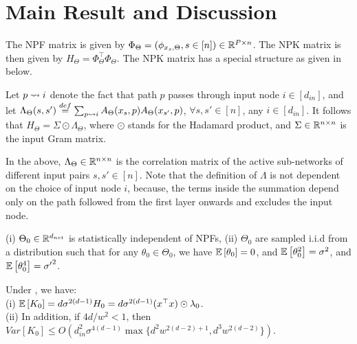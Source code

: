 \section{Main Result and Discussion}
The NPF matrix is given by $\Phi_{\Theta}=(\phi_{x_s,\Theta},s\in[n])\in\mathbb{R}^{P\times n}$. The NPK matrix is then given by $H_{\Theta}=\Phi^\top_{\Theta}\Phi_{\Theta}$. The NPK matrix has a special structure as given in  below.
\begin{lemma}\label{lm:npk}
Let $p\rightsquigarrow i$ denote the fact that path $p$ passes through input node $i\in[d_{in}]$, and let $\Lambda_{\Theta}(s,s')\stackrel{def}{=}\sum_{p\rightsquigarrow i} A_{\Theta}(x_s,p) A_{\Theta}(x_{s'},p)$, $\forall s,s'\in[n]$, any $i\in [d_{in}]$. It follows that $H_{\Theta}= \Sigma\odot\Lambda_{\Theta}$, where $\odot$ stands for the Hadamard product, and $\Sigma \in \mathbb{R}^{n\times n}$ is the input Gram matrix.
\end{lemma}
In the  above, $\Lambda_{\Theta}\in\mathbb{R}^{n\times n}$ is the correlation matrix of the active sub-networks of different input pairs $s,s'\in[n]$. Note that the definition of $\Lambda$ is not dependent on the choice of input node $i$, because, the terms inside the summation depend only on the path followed from the first layer onwards and excludes the input node.
\begin{assumption}\label{assmp:main}
(i) $\Theta_0\in\mathbb{R}^{d_{net}}$ is statistically independent of NPFs, (ii) $\Theta_0$ are sampled i.i.d from a distribution such that for any $\theta_0\in\Theta_0$,  we have $\mathbb{E}\left[\theta_0\right]=0$, and  $\mathbb{E}\left[\theta^2_0\right]=\sigma^2$, and $\mathbb{E}\left[\theta^4_0\right]={\sigma'}^2$.
\end{assumption}
\begin{theorem}\label{th:main} Under , we have:\\
(i) $\mathbb{E}\left[K_0\right]=d\sigma^{2(d-1)} H_0=d\sigma^{2(d-1)} (x^\top x)\odot \lambda_0$.\\
(ii) In addition, if ${4d}/{w^2}<1$, then $Var\left[K_0\right]\leq O\left(d^2_{in}\sigma^{4(d-1)}\max\{d^2w^{2(d-2)+1}, d^3w^{2(d-2)}\}\right)$.
\end{theorem}
